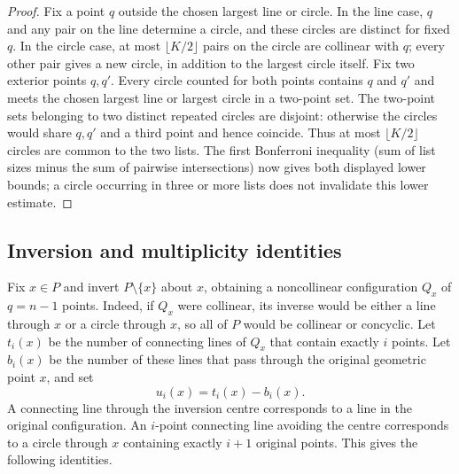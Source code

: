 \documentclass[11pt,a4paper]{article}
\theoremstyle{definition}
\begin{document}
\begin{proof}
Fix a point $q$ outside the chosen largest line or circle.  In the line case, $q$
and any pair on the line determine a circle, and these circles are distinct for
fixed $q$.  In the circle case, at most $\lfloor K/2\rfloor$ pairs on the circle
are collinear with $q$; every other pair gives a new circle, in addition to the
largest circle itself.  Fix two exterior points $q,q'$.  Every circle counted for
both points contains $q$ and $q'$ and meets the chosen largest line or largest circle
in a two-point set.  The two-point sets belonging to two distinct repeated circles
are disjoint: otherwise the circles would share $q,q'$ and a third point and hence
coincide.  Thus at most $\lfloor K/2\rfloor$ circles are common to the two lists.
The first Bonferroni inequality (sum of list sizes minus the sum of pairwise
intersections) now gives both displayed lower bounds; a circle occurring in three or
more lists does not invalidate this lower estimate.
\end{proof}

\subsection{Inversion and multiplicity identities}

Fix $x\in P$ and invert $P\setminus\{x\}$ about $x$, obtaining a noncollinear
configuration $Q_x$ of $q=n-1$ points.  Indeed, if $Q_x$ were collinear, its inverse
would be either a line through $x$ or a circle through $x$, so all of $P$ would be
collinear or concyclic.  Let $t_i(x)$ be the number of connecting
lines of $Q_x$ that contain exactly $i$ points.  Let $b_i(x)$ be the number of these
lines that pass through the original geometric point $x$, and set
\[
u_i(x)=t_i(x)-b_i(x).
\]
A connecting line through the inversion centre corresponds to a line in the original
configuration.  An $i$-point connecting line avoiding the centre corresponds to a
circle through $x$ containing exactly $i+1$ original points.  This gives the following
identities.
\end{document}
